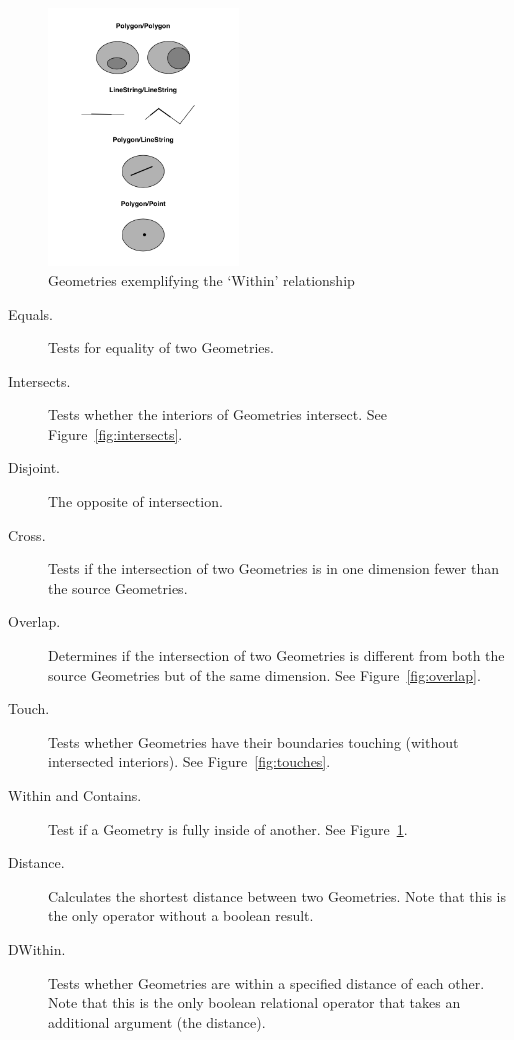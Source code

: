 \begin{figure}
    \centering

    \includegraphics[width=0.45\textwidth]{figures/within.png}
    
    \caption{Geometries exemplifying the `Within' relationship}
    \label{fig:within}
    
\end{figure}

\begin{description}
  \item[Equals.] Tests for equality of two Geometries.
  \item[Intersects.] Tests whether the interiors of Geometries intersect. See Figure~\ref{fig:intersects}.
  \item[Disjoint.] The opposite of intersection.
  \item[Cross.] Tests if the intersection of two Geometries is in one dimension fewer than the source Geometries.
  \item[Overlap.] Determines if the intersection of two Geometries is different from both the source Geometries but of the same dimension. See Figure~\ref{fig:overlap}.
  \item[Touch.] Tests whether Geometries have their boundaries touching (without intersected interiors). See Figure~\ref{fig:touches}.
  \item[Within and Contains.] Test if a Geometry is fully inside of another. See Figure~\ref{fig:within}.
  \item[Distance.] Calculates the shortest distance between two Geometries. Note that this is the only operator without a boolean result.
  \item[DWithin.] Tests whether Geometries are within a specified distance of each other. Note that this is the only boolean relational operator that takes an additional argument (the distance).
\end{description}

